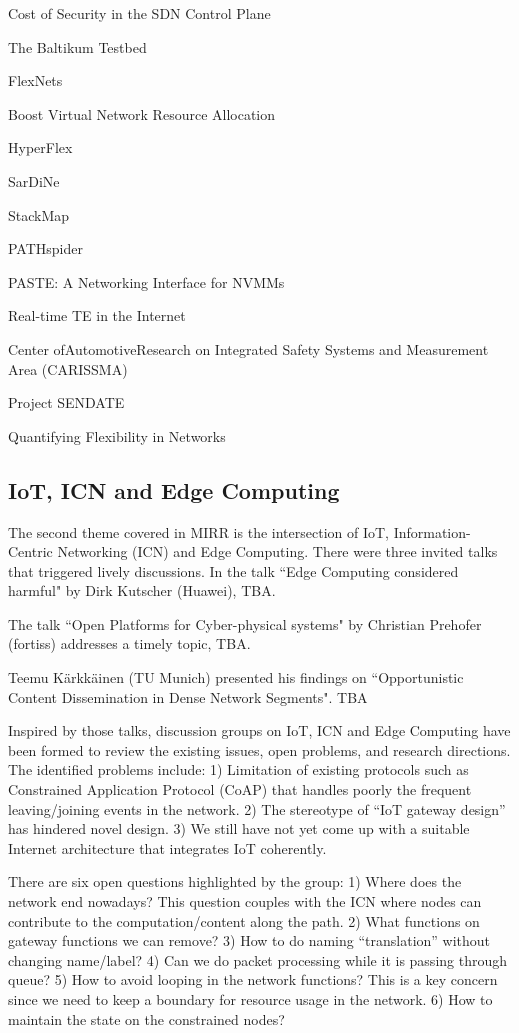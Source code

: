 Cost of Security in the SDN Control Plane

The Baltikum Testbed

FlexNets

Boost Virtual Network Resource Allocation

HyperFlex

SarDiNe

StackMap

PATHspider

PASTE: A Networking Interface for NVMMs

Real-time TE in the Internet

Center ofAutomotiveResearch on Integrated Safety Systems
and Measurement Area (CARISSMA)

Project SENDATE

Quantifying Flexibility in Networks


\subsection{IoT, ICN and Edge Computing}

The second theme covered in MIRR is the intersection of IoT, Information-Centric
Networking (ICN) and Edge Computing. There were three invited talks that triggered
lively discussions. In the talk ``Edge Computing considered harmful" by Dirk
Kutscher (Huawei), TBA.

The talk ``Open Platforms for Cyber-physical systems" by Christian Prehofer (fortiss)
addresses a timely topic, TBA.

Teemu Kärkkäinen (TU Munich) presented his findings on ``Opportunistic Content
Dissemination in Dense Network Segments". TBA

Inspired by those talks, discussion groups on IoT, ICN and Edge Computing
have been formed to review the existing issues, open problems, and
research directions. The identified problems include: 1) Limitation
of existing protocols such as Constrained Application Protocol (CoAP) that
handles poorly the frequent leaving/joining events in the network. 2) The
stereotype of ``IoT gateway design'' has hindered novel design. 3) We still
have not yet come up with a suitable Internet architecture that integrates
IoT coherently.

There are six open questions highlighted by the group: 1) Where does the network
end nowadays? This question couples
with the ICN where nodes can contribute to the computation/content along
the path. 2) What functions on gateway functions we can remove? 3) How to do
naming ``translation'' without changing name/label? 4) Can we do packet
processing while it is passing through queue? 5) How to avoid looping in
the network functions? This is a key concern since we need to keep a
boundary for resource usage in the network. 6) How to maintain the state on
the constrained nodes?

